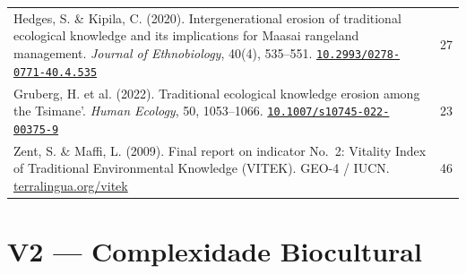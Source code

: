 \documentclass[a4paper,11pt]{article}
\newcommand{\doi}[1]{\href{https://doi.org/#1}{\texttt{#1}}}
\begin{document}
\begin{longtable}{>{\raggedright\arraybackslash}p{} c}
Hedges, S. \& Kipila, C. (2020). Intergenerational erosion of traditional ecological knowledge and its implications for Maasai rangeland management. \textit{Journal of Ethnobiology}, 40(4), 535--551.\newline
\doi{10.2993/0278-0771-40.4.535} & 27 \\
\addlinespace

Gruberg, H. et al. (2022). Traditional ecological knowledge erosion among the Tsimane'. \textit{Human Ecology}, 50, 1053--1066.\newline
\doi{10.1007/s10745-022-00375-9} & 23 \\
\addlinespace

Zent, S. \& Maffi, L. (2009). Final report on indicator No.~2: Vitality Index of Traditional Environmental Knowledge (VITEK). GEO-4 / IUCN.\newline
\href{https://www.terralingua.org/vitek/}{terralingua.org/vitek} & 46 \\

\bottomrule
\end{longtable}

\section{V2 --- Complexidade Biocultural}
\end{document}

